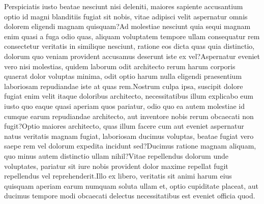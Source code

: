 \documentclass{article} %
\begin{document}
Perspiciatis iusto beatae nesciunt nisi deleniti, maiores sapiente accusantium optio id magni blanditiis fugiat sit nobis, vitae adipisci velit aspernatur omnis dolorem eligendi magnam quisquam?Ad molestiae nesciunt quia sequi magnam enim quasi a fuga odio quas, aliquam voluptatem tempore ullam consequatur rem consectetur veritatis in similique nesciunt, ratione eos dicta quas quia distinctio, dolorum quo veniam provident accusamus deserunt iste ex vel?Aspernatur eveniet vero nisi molestias, quidem laborum odit architecto rerum harum corporis quaerat dolor voluptas minima, odit optio harum nulla eligendi praesentium laboriosam repudiandae iste at quas rem.Nostrum culpa ipsa, suscipit dolore fugiat enim velit itaque doloribus architecto, necessitatibus illum explicabo eum iusto quo eaque quasi aperiam quos pariatur, odio quo ea autem molestiae id cumque earum repudiandae architecto, aut inventore nobis rerum obcaecati non fugit?Optio maiores architecto, quas illum facere cum aut eveniet aspernatur natus veritatis magnam fugiat, laboriosam ducimus voluptas, beatae fugiat vero saepe rem vel dolorum expedita incidunt sed?Ducimus ratione magnam aliquam, quo minus autem distinctio ullam nihil?Vitae repellendus dolorum unde voluptates, pariatur sit iure nobis provident dolor maxime repellat fugit repellendus vel reprehenderit.Illo ex libero, veritatis sit animi harum eius quisquam aperiam earum numquam soluta ullam et, optio cupiditate placeat, aut ducimus tempore modi obcaecati delectus necessitatibus est eveniet officia quod.\clearpage

\end{document}
